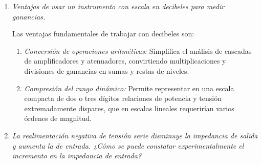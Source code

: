 \begin{enumerate}[label=\alph*)]
    Los multímetros digitales modernos que incorporan la función de lectura de decibeles ($dB$, $dBm$ o $dBu$) realizan el cálculo logarítmico mediante procesamiento de señal interno y presentan la lectura directa en su pantalla de cristal líquido.
    Las principales diferencias operativas son:
    \begin{itemize}
        \item \textit{Eliminación de la corrección manual:} El multímetro digital realiza el cambio de rango de manera automática (autorango) y compensa el cálculo internamente, evitando tener que realizar sumas manuales.
        \item \textit{Selección de la impedancia de referencia ($R_{\text{ref}}$):} Muchos instrumentos digitales permiten configurar la resistencia de referencia sobre la cual calcular los $dBm$ (por ejemplo, $50\ohm$, $75\ohm$, $600\ohm$, $1\kohm$). En el instrumento analógico, la escala está rígidamente calibrada para $600\ohm$, obligando al operador a calcular el término corrector de manera externa si la carga varía.
        \item \textit{Inexistencia de errores de lectura:} Se suprimen por completo los errores debidos a paralaje y la interpolación ocular necesarios en las escalas de aguja analógicas.
    \end{itemize}
    
    \item \textit{Ventajas de usar un instrumento con escala en decibeles para medir ganancias.}
    
    Las ventajas fundamentales de trabajar con decibeles son:
    \begin{enumerate}
        \item \textit{Conversión de operaciones aritméticas:} Simplifica el análisis de cascadas de amplificadores y atenuadores, convirtiendo multiplicaciones y divisiones de ganancias en sumas y restas de niveles.
        \item \textit{Compresión del rango dinámico:} Permite representar en una escala compacta de dos o tres dígitos relaciones de potencia y tensión extremadamente dispares, que en escalas lineales requerirían varios órdenes de magnitud.
    \end{enumerate}
    
    \item \textit{La realimentación negativa de tensión serie disminuye la impedancia de salida y aumenta la de entrada. ¿Cómo se puede constatar experimentalmente el incremento en la impedancia de entrada?}
    

\end{enumerate}
